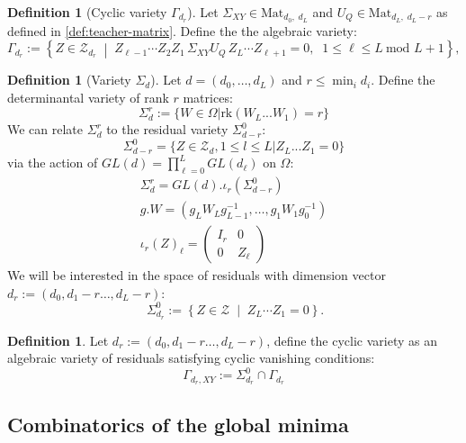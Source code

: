 \documentclass{article}
\theoremstyle{definition}
\newtheorem{definition}[theorem]{Definition}
\begin{document}
\begin{definition}[Cyclic variety $\Gamma_{d_r}$]
Let $\Sigma_{XY} \in \mathrm{Mat}_{d_0,\; d_L}$ and $U_Q \in \mathrm{Mat}_{d_L,\; d_L - r}$ as defined in \ref{def:teacher-matrix}. Define the the algebraic variety:
\[
\Gamma_{d_r}
:=
\left\{
Z \in \mathcal Z_{d_r}
\;\middle|\;
Z_{\ell-1}\cdots Z_2 Z_1 \,\Sigma_{XY} U_Q\, Z_L \cdots Z_{\ell+1} = 0,
\;\; 1 \le \ell \le L \ \text{mod } L+1
\right\},
\]
\end{definition}
\begin{definition}[Variety $\Sigma_d$] Let $d=(d_0,\dots,d_L)$ and $r\le \min_i d_i$. Define the determinantal variety of rank $r$ matrices:
\begin{equation*}
    \Sigma_{d}^r := \{W\in\Omega| \text{rk}(W_L...W_1) = r\}
\end{equation*}
We can relate $\Sigma_{d}^r$ to the residual variety $\Sigma_{d-r}^0$:
\begin{equation*}
    \Sigma_{d-r}^0 = \{Z\in\mathcal{Z}_d, 1\leq l \leq L| Z_L...Z_1 = 0\}
\end{equation*}
via the action of $GL(d) = \prod_{\ell=0}^L GL(d_{\ell})$ on $\Omega$:
\begin{align*}
    \Sigma_{d}^r = GL(d).\iota_r(\Sigma_{d-r}^0) \\
    g.W = (g_L W_L g_{L-1}^{-1}, \dots, g_1 W_1 g_0^{-1}) \\
    \iota_r(Z)_\ell = \begin{pmatrix} I_r & 0 \\ 0 & Z_\ell \end{pmatrix}
\end{align*}
We will be interested in the space of residuals with dimension vector $d_r:=(d_0, d_1-r\dots,d_L-r)$:
\[\
\Sigma^0_{d_r}
:=
\left\{
Z\in \mathcal Z
\;\middle|\;
Z_L\cdots Z_1=0
\right\}.
\]
\end{definition}
\begin{definition}
Let $d_r:=(d_0, d_1-r\dots,d_L-r)$, define the cyclic variety as an algebraic variety of residuals satisfying  cyclic vanishing conditions:
\[
\Gamma_{d_r,XY}:= \Sigma^0_{d_r}\cap\Gamma_{d_r}
\]
\end{definition}
\subsection{Combinatorics of the global minima}
\end{document}
